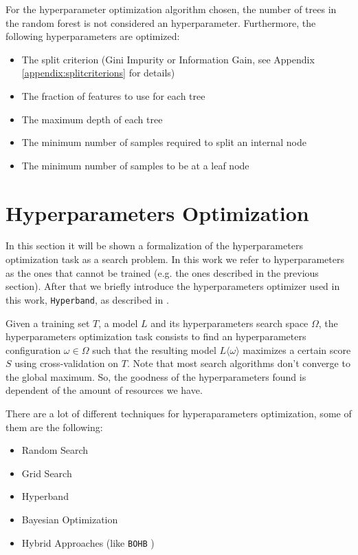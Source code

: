 \documentclass[11pt, a4paper]{article}
\begin{document}
    For the hyperparameter optimization algorithm chosen, the number of trees in the random forest is not considered an hyperparameter.
    Furthermore, the following hyperparameters are optimized:
    \begin{itemize}
      \item The split criterion (Gini Impurity or Information Gain, see Appendix \ref{appendix:splitcriterions} for details)
      \item The fraction of features to use for each tree
      \item The maximum depth of each tree
      \item The minimum number of samples required to split an internal node
      \item The minimum number of samples to be at a leaf node
    \end{itemize}

\section{Hyperparameters Optimization}
  In this section it will be shown a formalization of the hyperparameters optimization task as a search problem.
  In this work we refer to hyperparameters as the ones that cannot be trained (e.g. the ones described in the previous section).
  After that we briefly introduce the hyperparameters optimizer used in this work, \texttt{Hyperband}, as described in \cite{hyperband}.

  Given a training set $T$, a model $L$ and its hyperparameters search space $\Omega$, the hyperparameters optimization task consists to find an hyperparameters configuration $\omega \in \Omega$ such that the resulting model $L\langle\omega\rangle$ maximizes a certain score $S$ using cross-validation on $T$.
  Note that most search algorithms don't converge to the global maximum.
  So, the goodness of the hyperparameters found is dependent of the amount of resources we have.

  There are a lot of different techniques for hyperaparameters optimization, some of them are the following:
  \begin{itemize}
    \item Random Search
    \item Grid Search
    \item Hyperband
    \item Bayesian Optimization
    \item Hybrid Approaches (like \texttt{BOHB} \cite{bohb})
  \end{itemize}
\end{document}
